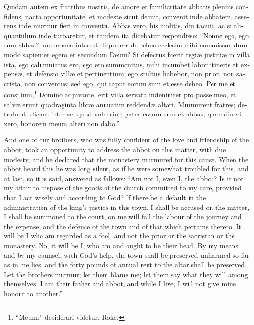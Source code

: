 \documentclass[10pt]{book}
\begin{document}
\begin{paracol}{2}
\switchcolumn*

\begin{otherlanguage}{latin}
Quidam autem ex fratribus nostris, de amore et familiaritate abbatis plenius confidens, nacta opportunitate, et modeste sicut decuit, convenit inde abbatem, asserens inde murmur fieri in conventu. Abbas vero, his auditis, diu tacuit, ac si aliquantulum inde turbaretur, et tandem ita dicebatur respondisse: ``Nonne ego, ego sum abbas? nonne mea interest disponere de rebus ecclesi\ae{} mihi commiss\ae{}, dummodo sapienter egero et secundum Deum? Si defectus fuerit regi\ae{} justiti\ae{} in villa ista, ego calumniatus ero, ego ero summonitus, mihi incumbet labor itineris et expens\ae{}, et defensio vill\ae{} et pertinentium; ego stultus habebor, non prior, non sacrista, non conventus; sed ego, qui caput eorum sum et esse debeo. Per me et consilium,\footnote[\textdagger]{``Meum,'' desiderari videtur. Roke.} Domino adjuvante, erit villa servata indeniniter pro posse meo, et salv\ae{} erunt quadraginta libr\ae{} annuatim reddend\ae{} altari. Murmurent fratres; detrahant; dicant inter se, quod voluerint; pater eorum sum et abbas; quamdiu vixero, honorem meum alteri non dabo.''
\end{otherlanguage}

\switchcolumn

And one of our brothers, who was fully confident of the love and friendship of the abbot, took an opportunity to address the abbot on this matter, with due modesty, and he declared that the monastery murmured for this cause. When the abbot heard this he was long silent, as if he were somewhat troubled for this, and at last, so it is said, answered as follows: ``Am not I, even I, the abbot? Is it not my affair to dispose of the goods of the church committed to my care, provided that I act wisely and according to God? If there be a default in the administration of the king's justice in this town, I shall be accused on the matter, I shall be summoned to the court, on me will fall the labour of the journey and the expense, and the defence of the town and of that which pertains thereto. It will be I who am regarded as a fool, and not the prior or the sacristan or the monastery. No, it will be I, who am and ought to be their head. By my means and by my counsel, with God's help, the town shall be preserved unharmed so far as in me lies, and the forty pounds of annual rent to the altar shall be preserved. Let the brothers murmur; let them blame me; let them say what they will among themselves. I am their father and abbot, and while I live, I will not give mine honour to another.''


\end{paracol}
\end{document}
